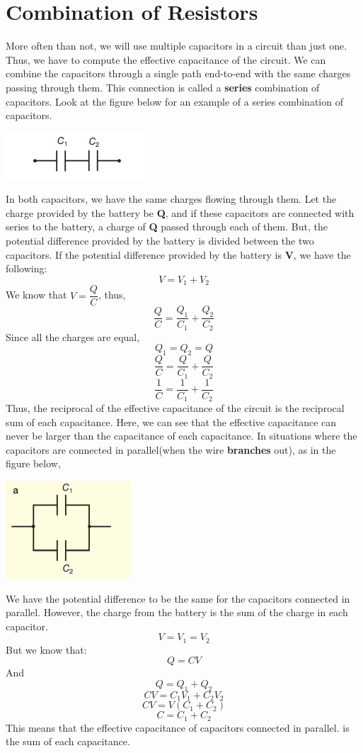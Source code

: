 \documentclass[9pt,addpoints]{exam}
\begin{document}
	\section*{Combination of Resistors}
	More often than not, we will use multiple capacitors in a circuit than just one. Thus, we have to compute the effective capacitance of the circuit.\newline
	We can combine the capacitors through a single path end-to-end with the same charges passing through them. This connection is called a \textbf{series} combination of capacitors. Look at the figure below for an example of a series combination of capacitors. \\
	\begin{center}
	\includegraphics[scale=1]{series_capacitors.png}	
	\end{center}
	In both capacitors, we have the same charges flowing through them. Let the charge provided by the battery be \textbf{Q}, and if these capacitors are connected with series to the battery, a charge of \textbf{Q} passed through each of them. But, the potential difference provided by the battery is divided between the two capacitors. If the potential difference provided by the battery is \textbf{V}, we have the following: \newline
	$$V = V_1 + V_2$$
	We know that $V=\dfrac{Q}{C}$, thus,
	$$\dfrac{Q}{C} = \frac{Q_1}{C_1} + \frac{Q_2}{C_2}$$
	Since all the charges are equal,
	$$Q_1=Q_2=Q$$
	$$\frac{Q}{C} = \frac{Q}{C_1} + \frac{Q}{C_2}$$
	$$\frac{1}{C} = \frac{1}{C_1} + \frac{1}{C_2}$$    
	Thus, the reciprocal of the effective capacitance of the circuit is the reciprocal sum of each capacitance. Here, we can see that the effective capacitance can never be larger than the capacitance of each capacitance.
	In situations where the capacitors are connected in parallel(when the wire \textbf{branches} out), as in the figure below,\\
	\begin{center}
	\includegraphics[scale=1]{parallel_capacitors.png}	
	\end{center}
	We have the potential difference to be the same for the capacitors connected in parallel. However, the charge from the battery is the sum of the charge in each capacitor.
	$$V = V_1 = V_2$$
	But we know that:
	$$Q=CV$$
	And
	$$Q = Q_1 + Q_2$$
	$$CV= C_1V_1 + C_2V_2$$
	$$CV = V(C_1+C_2)$$
	$$C = C_1 + C_2$$
	This means that the effective capacitance of capacitors connected in parallel. is the sum of each capacitance.
				
	
\end{document}
